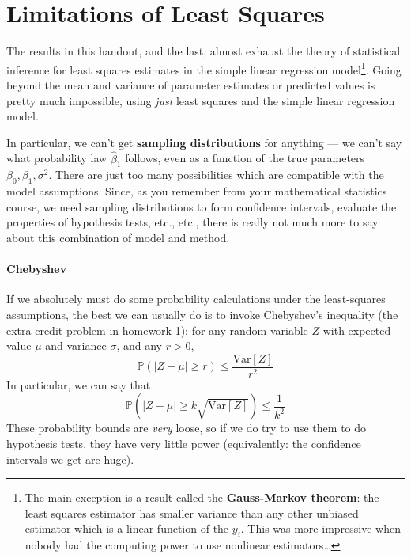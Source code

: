 \documentclass{article}
\newcommand{\Var}[1]{\mathrm{Var}\left[ #1 \right]}
\newcommand{\Prob}[1]{\mathbb{P}\left( #1 \right)}
\begin{document}
\section{Limitations of Least Squares}

The results in this handout, and the last, almost exhaust the theory of
statistical inference for least squares estimates in the simple linear
regression model\footnote{The main exception is a result called the {\bf
    Gauss-Markov theorem}: the least squares estimator has smaller variance
  than any other unbiased estimator which is a linear function of the $y_i$.
  This was more impressive when nobody had the computing power to use nonlinear
  estimators\ldots}.  Going beyond the mean and variance of parameter estimates
or predicted values is pretty much impossible, using {\em just} least squares
and the simple linear regression model.

In particular, we can't get {\bf sampling distributions} for anything --- we
can't say what probability law $\hat{\beta}_1$ follows, even as a function of
the true parameters $\beta_0, \beta_1, \sigma^2$.  There are just too many
possibilities which are compatible with the model assumptions.  Since, as you
remember from your mathematical statistics course, we need sampling
distributions to form confidence intervals, evaluate the properties of
hypothesis tests, etc., etc., there is really not much more to say about this
combination of model and method.

\paragraph{Chebyshev} If we absolutely must do some probability calculations
under the least-squares assumptions, the best we can usually do is to invoke
Chebyshev's inequality (the extra credit problem in homework 1): for any
random variable $Z$ with expected value $\mu$ and variance $\sigma$, and any $r > 0$,
\begin{equation}
\Prob{|Z-\mu| \geq r} \leq \frac{\Var{Z}}{r^2}
\end{equation}
In particular, we can say that
\begin{equation}
\Prob{|Z-\mu| \geq k \sqrt{\Var{Z}}} \leq \frac{1}{k^2}
\end{equation}
These probability bounds are {\em very} loose, so if we do try to use them
to do hypothesis tests, they have very little power (equivalently:
the confidence intervals we get are huge).
\end{document}
